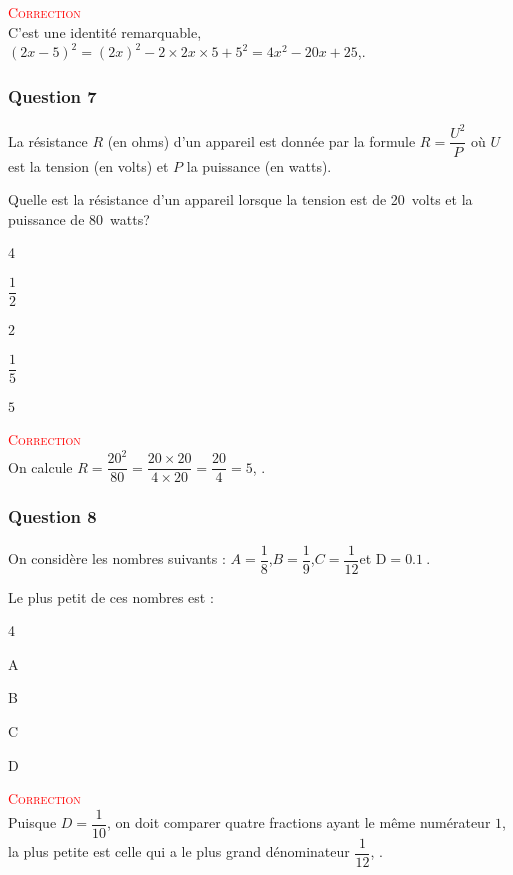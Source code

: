 \documentclass[10pt]{article}
\providecommand{\np}[2][]{{#2~#1}}
\begin{document}
\textcolor{red}{\textsc{Correction}}\\
C'est une identité remarquable, \mbox{$(2x-5)^2=(2x)^2-2\times2x\times5+5^2=4x^2-20x+25$},.
\subsubsection*{Question 7}

	La résistance $R$ (en ohms) d'un appareil est donnée par la formule \mbox{$R=\dfrac{U^2}{P}$} où $U$ est la tension (en volts) et $P$ la puissance (en watts).

	Quelle est la résistance d'un appareil lorsque la tension est de 20~volts et la puissance de 80~watts?

		\begin{enumerate}[label=\alph*)]
		\begin{multicols}{4}
		\null\vfill	\item $\dfrac12$ \vfill \null
			\columnbreak
		\null\vfill		\item $2$ \vfill \null
			\columnbreak
		\null\vfill		\item $\dfrac15$ \vfill \null
			\columnbreak
		\null\vfill		\item $5$\vfill\null

		\end{multicols}
	\end{enumerate}


	\textcolor{red}{\textsc{Correction}}\\
	On calcule \mbox{$R=\dfrac{20^2}{80}=\dfrac{20\times{20}}{4\times{20}}=\dfrac{20}{4}=5$}, \framebox[1.2\width]{réponse D}.
\subsubsection*{Question 8}
On considère les nombres suivants : \quad \mbox{$A=\dfrac18$},\quad \mbox{$B=\dfrac19$},\quad \mbox{$C=\dfrac{1}{12}$}\quad et \quad \mbox{D$=\np{0.1}$}.

Le plus petit de ces nombres est :
\begin{enumerate}[label=\alph*)]
	\begin{multicols}{4}
		\item A
		\item B
		\item C
		\item D
		\end{multicols}
\end{enumerate}


\textcolor{red}{\textsc{Correction}}\\
Puisque \mbox{$D=\dfrac{1}{10}$}, on doit comparer quatre fractions ayant le même numérateur $1$, la plus petite est celle qui a le plus grand dénominateur \mbox{$\dfrac{1}{12}$}, .
\vspace{10mm}
\begin{center}
\end{center}

\vspace{10mm}
\end{document}
